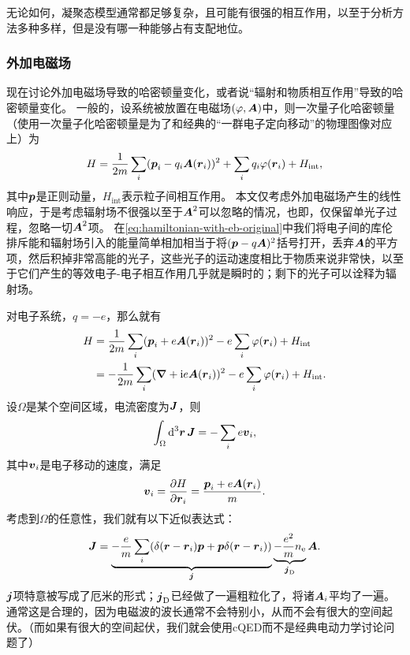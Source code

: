 \documentclass[hyperref, UTF8, a4paper]{ctexart}
\newcommand*{\ii}{\mathrm{i}}
\begin{document}
无论如何，凝聚态模型通常都足够复杂，且可能有很强的相互作用，以至于分析方法多种多样，但是没有哪一种能够占有支配地位。

\subsubsection{外加电磁场}

现在讨论外加电磁场导致的哈密顿量变化，或者说“辐射和物质相互作用”导致的哈密顿量变化。
一般的，设系统被放置在电磁场$(\varphi, \vb*{A})$中，则一次量子化哈密顿量（使用一次量子化哈密顿量是为了和经典的“一群电子定向移动”的物理图像对应上）为
\begin{equation}
    {H} = \frac{1}{2m} \sum_i ({\vb*{p}_i} - q_i \vb*{A}({\vb*{r}_i}))^2 + \sum_i q_i \varphi({\vb*{r}}_i) + {H}_\text{int},
    \label{eq:hamiltonian-with-eb-original}
\end{equation}
其中$\vb*{p}$是正则动量，${H}_\text{int}$表示粒子间相互作用。
本文仅考虑外加电磁场产生的线性响应，于是考虑辐射场不很强以至于$\vb*{A}^2$可以忽略的情况，也即，仅保留单光子过程，忽略一切$\vb*{A}^2$项。
在\eqref{eq:hamiltonian-with-eb-original}中我们将电子间的库伦排斥能和辐射场引入的能量简单相加相当于将$({\vb*{p}} - q \vb*{A})^2$括号打开，丢弃$\vb*{A}$的平方项，然后积掉非常高能的光子，这些光子的运动速度相比于物质来说非常快，以至于它们产生的等效电子-电子相互作用几乎就是瞬时的；剩下的光子可以诠释为辐射场。

对电子系统，$q=-e$，那么就有
\begin{equation}
    \begin{aligned}
        {H} &= \frac{1}{2m} \sum_i ({\vb*{p}_i} + e \vb*{A}({\vb*{r}_i}))^2 - e \sum_i \varphi({\vb*{r}}_i) + {H}_\text{int} \\ 
        &= - \frac{1}{2m} \sum_i (\grad + \ii e \vb*{A}({\vb*{r}_i}))^2 - e \sum_i \varphi({\vb*{r}}_i) + {H}_\text{int}.
    \end{aligned}
\end{equation}
设$\Omega$是某个空间区域，电流密度为$\vb*{J}$，则
\begin{equation}
    \int_\Omega \dd[3]{\vb*{r}} {\vb*{J}} = - \sum_i e {\vb*{v}}_i,
\end{equation}
其中$\vb*{v}_i$是电子移动的速度，满足
\begin{equation}
    {\vb*{v}}_i = \pdv{H}{\vb*{r}_i} = \frac{{\vb*{p}}_i + e \vb*{A}({\vb*{r}}_i)}{m}.
\end{equation}
考虑到$\Omega$的任意性，我们就有以下近似表达式：
\begin{equation}
    {\vb*{J}} = \underbrace{- \frac{e}{m} \sum_i ( \delta(\vb*{r} - {\vb*{r}}_i) {\vb*{p}} + {\vb*{p}} \delta(\vb*{r} - {\vb*{r}}_i) )}_{{\vb*{j}}} \underbrace{- \frac{e^2}{m} {n}_\text{e}}_{{\vb*{j}}_\text{D}} \vb*{A}.
\end{equation}
${\vb*{j}}$项特意被写成了厄米的形式；${\vb*{j}}_\text{D}$已经做了一遍粗粒化了，将诸$\vb*{A}_i$平均了一遍。
通常这是合理的，因为电磁波的波长通常不会特别小，从而不会有很大的空间起伏。（而如果有很大的空间起伏，我们就会使用cQED而不是经典电动力学讨论问题了）
\end{document}

